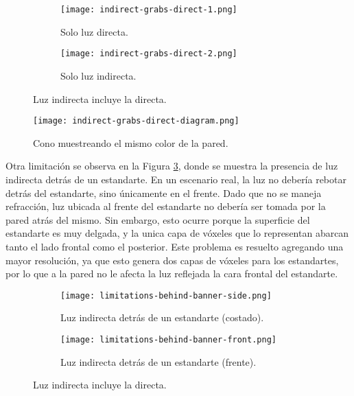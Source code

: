 \begin{figure}[h]
    \begin{center}
    \begin{subfigure}{.49\textwidth}
        \texttt{[image: indirect-grabs-direct-1.png]}
        \caption{Solo luz directa.}
    \end{subfigure}
    \begin{subfigure}{.49\textwidth}
        \texttt{[image: indirect-grabs-direct-2.png]}
        \caption{Solo luz indirecta.}
    \end{subfigure}
    \caption{Luz indirecta incluye la directa.}
    \label{fig:indirect-grabs-direct}
    \end{center}
\end{figure}

\begin{figure}[h]
	\begin{center}
	\texttt{[image: indirect-grabs-direct-diagram.png]}
	\caption{Cono muestreando el mismo color de la pared.}
	\label{fig:indirect-grabs-direct-diagram}
	\end{center}
\end{figure}

Otra limitación se observa en la Figura \ref{fig:indirect-behind-banner}, donde se muestra la presencia de luz indirecta detrás de un estandarte.
En un escenario real, la luz no debería rebotar detrás del estandarte, sino únicamente en el frente.
Dado que no se maneja refracción, luz ubicada al frente del estandarte no debería ser tomada por la pared atrás del mismo.
Sin embargo, esto ocurre porque la superficie del estandarte es muy delgada, y la unica capa de vóxeles que lo representan abarcan tanto el lado frontal como el posterior.
Este problema es resuelto agregando una mayor resolución, ya que esto genera dos capas de vóxeles para los estandartes, por lo que a la pared no le afecta la luz reflejada la cara frontal del estandarte.

\begin{figure}[h]
    \begin{center}
    \begin{subfigure}{.49\textwidth}
        \texttt{[image: limitations-behind-banner-side.png]}
        \caption{Luz indirecta detrás de un estandarte (costado).}
    \end{subfigure}
    \begin{subfigure}{.49\textwidth}
        \texttt{[image: limitations-behind-banner-front.png]}
        \caption{Luz indirecta detrás de un estandarte (frente).}
    \end{subfigure}
    \caption{Luz indirecta incluye la directa.}
	\label{fig:indirect-behind-banner}
    \end{center}
\end{figure}
